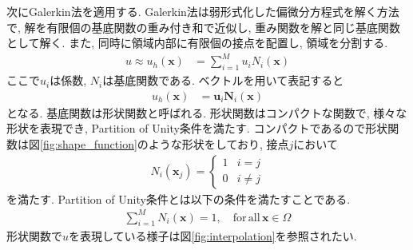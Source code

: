 \documentclass{ltjsarticle}
\begin{document}
次にGalerkin法を適用する.
Galerkin法は弱形式化した偏微分方程式を解く方法で,
解を有限個の基底関数の重み付き和で近似し, 重み関数を解と同じ基底関数として解く.
また, 同時に領域内部に有限個の接点を配置し, 領域を分割する.
\begin{align}
    u\approx u_h(\bm{x}) &= \sum_{i=1}^M u_iN_i(\bm{x}) \label{eq:u_approx} 
\end{align}
ここで$u_i$は係数, $N_i$は基底関数である.
ベクトルを用いて表記すると
\begin{align}
    u_h(\bm{x}) &= \bm{u}_i\bm{N}_i(\bm{x}) \label{eq:interpolation}
\end{align}
となる.
基底関数は形状関数と呼ばれる.
形状関数はコンパクトな関数で, 様々な形状を表現でき, Partition of Unity条件を満たす.
コンパクトであるので形状関数は図\ref{fig:shape_function}のような形状をしており, 接点$j$において
\begin{align}
    N_i(\bm{x}_j) =
    \begin{cases}
        1 & i=j\\
        0 & i\neq j
    \end{cases}
\end{align}
を満たす.
Partition of Unity条件とは以下の条件を満たすことである.
\begin{align}
    \sum_{i=1}^MN_i(\bm{x}) = 1,\quad \mathrm{for\,all}\,\bm{x}\in\Omega
\end{align}
形状関数で$u$を表現している様子は図\ref{fig:interpolation}を参照されたい.
\end{document}
